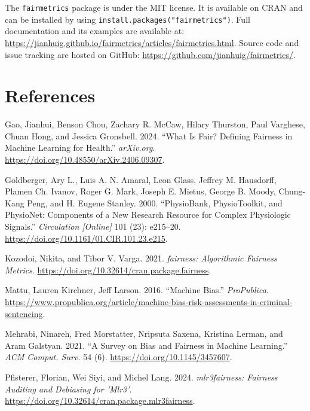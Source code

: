 \documentclass[10pt,a4paper,onecolumn]{article}
\newlength{\cslhangindent}
\newenvironment{CSLReferences}[2] %
 {\begin{list}{}{%
  \setlength{\itemindent}{0pt}
  \setlength{\leftmargin}{0pt}
  \setlength{\parsep}{0pt}
  \ifodd #1
   \setlength{\leftmargin}{\cslhangindent}
   \setlength{\itemindent}{-1\cslhangindent}
  \fi
  \setlength{\itemsep}{#2\baselineskip}}}
 {\end{list}}
\begin{document}
The \texttt{fairmetrics} package is under the MIT license. It is
available on CRAN and can be installed by using
\texttt{install.packages("fairmetrics")}. Full documentation and its
examples are available at:
\url{https://jianhuig.github.io/fairmetrics/articles/fairmetrics.html}.
Source code and issue tracking are hosted on GitHub:
\url{https://github.com/jianhuig/fairmetrics/}.

\section*{References}\label{references}

\label{refs}
\begin{CSLReferences}{1}{0}
Gao, Jianhui, Benson Chou, Zachary R. McCaw, Hilary Thurston, Paul
Varghese, Chuan Hong, and Jessica Gronsbell. 2024. {``What Is Fair?
Defining Fairness in Machine Learning for Health.''} \emph{arXiv.org}.
\url{https://doi.org/10.48550/arXiv.2406.09307}.

Goldberger, Ary L., Luis A. N. Amaral, Leon Glass, Jeffrey M. Hausdorff,
Plamen Ch. Ivanov, Roger G. Mark, Joseph E. Mietus, George B. Moody,
Chung-Kang Peng, and H. Eugene Stanley. 2000. {``PhysioBank,
PhysioToolkit, and PhysioNet: Components of a New Research Resource for
Complex Physiologic Signals.''} \emph{Circulation {[}Online{]}} 101
(23): e215--20. \url{https://doi.org/10.1161/01.CIR.101.23.e215}.

Kozodoi, Nikita, and Tibor V. Varga. 2021. \emph{{fairness}: Algorithmic
Fairness Metrics}. \url{https://doi.org/10.32614/cran.package.fairness}.

Mattu, Lauren Kirchner, Jeff Larson. 2016. {``Machine {Bias}.''}
\emph{ProPublica}.
\url{https://www.propublica.org/article/machine-bias-risk-assessments-in-criminal-sentencing}.

Mehrabi, Ninareh, Fred Morstatter, Nripsuta Saxena, Kristina Lerman, and
Aram Galstyan. 2021. {``A Survey on Bias and Fairness in Machine
Learning.''} \emph{ACM Comput. Surv.} 54 (6).
\url{https://doi.org/10.1145/3457607}.

Pfisterer, Florian, Wei Siyi, and Michel Lang. 2024.
\emph{{mlr3fairness}: Fairness Auditing and Debiasing for 'Mlr3'}.
\url{https://doi.org/10.32614/cran.package.mlr3fairness}.


\end{CSLReferences}
\end{document}
